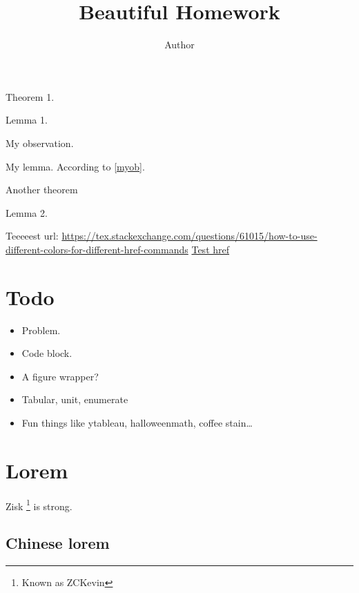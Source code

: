 \documentclass[12pt]{article}
\title{Beautiful Homework}
\author{Author}
\theoremstyle{myStyle}
\begin{document}
\maketitle
\begin{theorem}
	Theorem 1. \blindtext
\end{theorem}

\begin{lemma}
	Lemma 1.
\end{lemma}

\begin{observation}
	My observation.
	\label{myob}
\end{observation}

\begin{lemma}[My lemma]
	My lemma.
	According to \cref{myob}.
\end{lemma}

\begin{theorem}[My theorem]
	Another theorem
\end{theorem}

\begin{lemma}
	Lemma 2.
\end{lemma}

Teeeeest url: \url{https://tex.stackexchange.com/questions/61015/how-to-use-different-colors-for-different-href-commands}
\href{https://en.wikibooks.org/wiki/LaTeX/Counters}{Test href}

\section{Todo}
\begin{itemize}
	\item Problem.
	\item Code block.
	\item A figure wrapper?
	\item Tabular, unit, enumerate
	\item Fun things like ytableau, halloweenmath, coffee stain\ldots
\end{itemize}

\section{Lorem}

Zisk \footnote{Known as ZCKevin} is strong.

\subsection {Chinese lorem}
\end{document}

